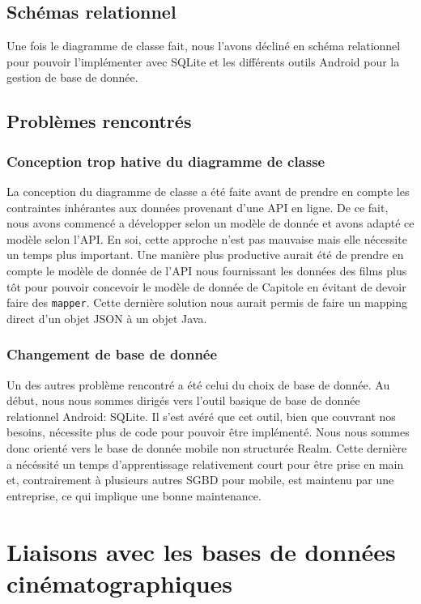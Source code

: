 \subsection*{Schémas relationnel}
Une fois le diagramme de classe fait, nous l'avons décliné en schéma relationnel pour pouvoir l'implémenter avec SQLite et les différents outils Android pour la gestion de base de donnée.


\subsection*{Problèmes rencontrés}
\subsubsection*{Conception trop hative du diagramme de classe}
La conception du diagramme de classe a été faite avant de prendre en compte les contraintes inhérantes aux données provenant d'une API en ligne. De ce fait, nous avons commencé a développer selon un modèle de donnée et avons adapté ce modèle selon l'API. En soi, cette approche n'est pas mauvaise mais elle nécessite un temps plus important. Une manière plus productive aurait été de prendre en compte le modèle de donnée de l'API nous fournissant les données des films plus tôt pour pouvoir concevoir le modèle de donnée de Capitole en évitant de devoir faire des \texttt{mapper}. Cette dernière solution nous aurait permis de faire un mapping direct d'un objet JSON à un objet Java.

\subsubsection*{Changement de base de donnée}
Un des autres problème rencontré a été celui du choix de base de donnée. Au début, nous nous sommes dirigés vers l'outil basique de base de donnée relationnel Android: SQLite. Il s'est avéré que cet outil, bien que couvrant nos besoins, nécessite plus de code pour pouvoir être implémenté. Nous nous sommes donc orienté vers le base de donnée mobile non structurée Realm. Cette dernière a nécéssité un temps d'apprentissage relativement court pour être prise en main et, contrairement à plusieurs autres SGBD pour mobile, est maintenu par une entreprise, ce qui implique une bonne maintenance.

\section{Liaisons avec les bases de données cinématographiques}

